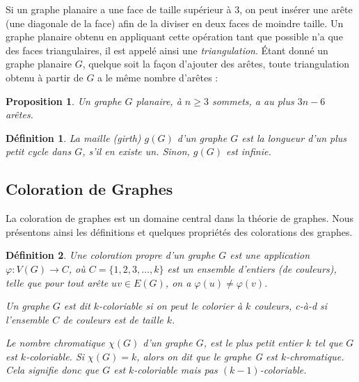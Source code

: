 \documentclass[10pt,a4paper]{article}
\newtheorem{definition}{Définition}
\newtheorem{proposition}{Proposition}
\newtheorem{exemple}{Exemple}
\begin{document}
Si un graphe planaire a une face de taille supérieur à 3, on peut insérer une arête (une diagonale de la face) afin de la diviser en deux faces de moindre taille. Un graphe planaire obtenu en appliquant cette opération tant que possible n'a que des faces triangulaires, il est appelé ainsi une \emph{triangulation}. Étant donné un graphe planaire $G$, quelque soit la façon d'ajouter des arêtes, toute triangulation obtenu à partir de $G$ a le même nombre d'arêtes :

\begin{proposition}
Un graphe $G$ planaire, à $n \geq 3$ sommets, a au plus $3n - 6$ arêtes.
\end{proposition}

\begin{definition}
La \emph{maille (girth)} $g(G)$ d'un graphe $G$ est la longueur d'un plus petit cycle dans $G$, s'il en existe un. Sinon, $g(G)$ est infinie. %
\end{definition}

\subsection{Coloration de Graphes}
La coloration de graphes est un domaine central dans la théorie de graphes. 
Nous présentons ainsi les définitions et quelques propriétés des colorations des graphes.


\begin{definition}%
Une \emph{coloration propre} d'un graphe $G$ est une application $\varphi: V(G) \to C$, où $C=\{1,2,3,\dots,k\}$ est un ensemble d'entiers (de \emph{couleurs}), telle que pour tout arête $uv \in E(G)$, on a $\varphi(u) \neq \varphi(v)$. 

Un graphe $G$ est dit \emph{$k$-coloriable} si on peut le colorier à $k$ couleurs, c-à-d si l'ensemble $C$ de couleurs est de taille $k$. 

Le \emph{nombre chromatique} $\chi(G)$ d'un graphe $G$, est le plus petit entier $k$ tel que $G$ est $k$-coloriable. Si $\chi(G) = k$, alors on dit que le graphe G est \emph{$k$-chromatique}. Cela signifie donc que $G$ est $k$-coloriable mais  pas $(k-1)$-coloriable.
\end{definition}

\end{document}
